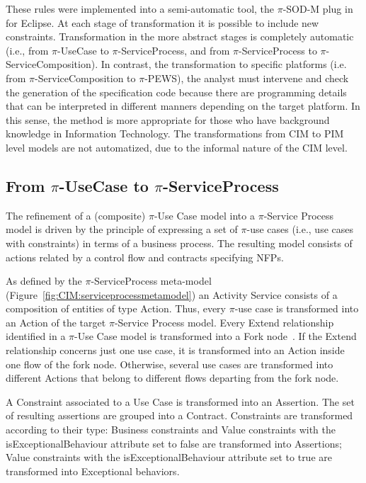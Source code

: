 \documentclass{singlecol-new}
\theoremstyle{TH}{
\newtheorem{lemma}{Lemma}
\newtheorem{theorem}[lemma]{Theorem}
\newtheorem{corrolary}[lemma]{Corrolary}
\newtheorem{conjecture}[lemma]{Conjecture}
\newtheorem{proposition}[lemma]{Proposition}
\newtheorem{claim}[lemma]{Claim}
\newtheorem{stheorem}[lemma]{Wrong Theorem}
\newtheorem{algorithm}{Algorithm}
}
\theoremstyle{THrm}{
\newtheorem{definition}{Definition}[section]
\newtheorem{question}{Question}[section]
\newtheorem{remark}{Remark}
\newtheorem{scheme}{Scheme}
}
\theoremstyle{THhit}{
\newtheorem{case}{Case}[section]
}
\theoremstyle{THhsl}{
\newtheorem{example}{Example}
}
\begin{document}
These rules were implemented into a semi-automatic tool, the $\pi$-SOD-M  plug in for Eclipse. At each stage of transformation it is possible to include new constraints.
Transformation in the more abstract stages is completely automatic  (i.e., from $\pi$-UseCase to $\pi$-ServiceProcess, and from $\pi$-ServiceProcess to $\pi$-ServiceComposition). In contrast, the transformation to specific platforms (i.e. from $\pi$-ServiceComposition to $\pi$-PEWS), the analyst must intervene and check the generation of the specification code because there are programming details that can be interpreted in different manners depending on the target platform. In this sense, the method is more appropriate for those who have background knowledge in Information Technology.
The transformations from CIM to PIM level models are not automatized, due to the informal nature of the CIM level.
 
\subsection{From $\pi$-UseCase to $\pi$-ServiceProcess}

The refinement of a (composite) $\pi$-Use Case model into a $\pi$-Service Process model is driven by the principle of expressing a set of $\pi$-use cases (i.e., use cases with constraints)   in terms of  a business process.
The resulting model consists of actions related by a control flow and contracts specifying NFPs. 

As defined by the $\pi$-ServiceProcess  meta-model (Figure~\ref{fig:CIM:serviceprocessmetamodel}) an {\sc Activity Service} consists of a composition of  entities of type {\sc Action}. 
Thus, every {\sf $\pi$-use case} is transformed into an {\sf Action} of the target $\pi$-Service Process model.  
Every {\sf Extend} relationship identified in a $\pi$-Use Case model is
transformed into a  {\sf Fork node}~\cite{valeriaThesis}.%
If the {\sf Extend} relationship concerns just one {\sf use case}, it is transformed into an {\sf Action} inside one flow of the fork node. 
Otherwise, several  {\sf use cases} are transformed into different {\sf Actions} that belong to different flows departing from the fork node.   

%
A {\sf Constraint} associated to a {\sf Use Case}  is transformed into an  {\sf Assertion}.  
The set of resulting assertions  are grouped into a {\sf Contract}.
Constraints are transformed according to their type:
{\sc Business} constraints and {\sc Value} constraints with the {\sf  isExceptionalBehaviour} at\-tri\-bute set to false are transformed into {\sf Assertion}s;
{\sc Value } constraints with the {\sf  isExceptionalBehaviour} attribute set to true are transformed into {\sf Exceptional behavior}s.
\end{document}
